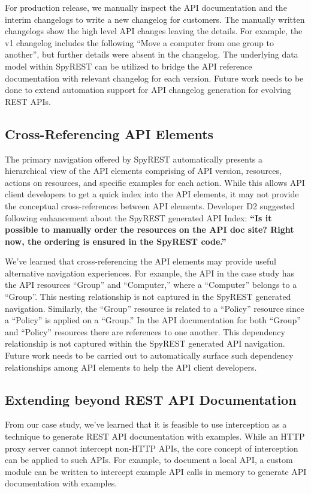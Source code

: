 \documentclass[10pt, conference]{IEEEtran}
\begin{document}
For production release, we manually inspect the API documentation and the interim changelogs to write a new changelog for customers. The manually written changelogs show the high level API changes leaving the details. For example, the v1 changelog includes the following ``Move a computer from one group to another'', but further details were absent in the changelog. The underlying data model within SpyREST can be utilized to bridge the API reference documentation with relevant changelog for each version. Future work needs to be done to extend automation support for API changelog generation for evolving REST APIs.

\subsection{Cross-Referencing API Elements}
The primary navigation offered by SpyREST automatically presents a hierarchical view of the API elements comprising of API version, resources, actions on resources, and specific examples for each action. While this allows API client developers to get a quick index into the API elements, it may not provide the conceptual cross-references between API elements. Developer D2 suggested following enhancement about the SpyREST generated API Index: \textbf{``Is it possible to manually order the resources on the API doc site? Right now, the ordering is ensured in the SpyREST code.''}

We've learned that cross-referencing the API elements may provide useful alternative navigation experiences. For example, the API in the case study has the API resources ``Group'' and ``Computer,'' where a ``Computer'' belongs to a ``Group''. This nesting relationship is not captured in the SpyREST generated navigation. Similarly, the ``Group'' resource is related to a ``Policy'' resource since a ``Policy'' is applied on a ``Group.'' In the API documentation for both ``Group'' and ``Policy'' resources there are references to one another. This dependency relationship is not captured within the SpyREST generated API navigation. Future work needs to be carried out to automatically surface such dependency relationships among API elements to help the API client developers.


\subsection{Extending beyond REST API Documentation}
From our case study, we've learned that it is feasible to use interception as a technique to generate REST API documentation with examples. While an HTTP proxy server cannot intercept non-HTTP APIs, the core concept of interception can be applied to such APIs. For example, to document a local API, a custom module can be written to intercept example API calls in memory to generate API documentation with examples.
\end{document}
